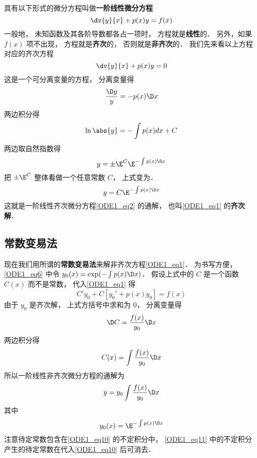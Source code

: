

具有以下形式的微分方程叫做\textbf{一阶线性微分方程}
\begin{equation}\label{ODE1_eq1}
\dv{y}{x} + p(x)y = f(x)
\end{equation}
一般地， 未知函数及其各阶导数都各占一项时， 方程就是\textbf{线性}的． 另外，如果 $f(x)$ 项不出现， 方程就是\textbf{齐次}的， 否则就是\textbf{非齐次}的． 我们先来看以上方程对应的齐次方程
\begin{equation}\label{ODE1_eq2}
\dv{y}{x} + p(x)y = 0
\end{equation}
这是一个可分离变量的方程， 分离变量得
\begin{equation}
\frac{\D y}{y} = -p(x) \D x
\end{equation}
两边积分得
\begin{equation}
\ln\abs{y} = -\int p(x) dx + C
\end{equation}
两边取自然指数得
\begin{equation}
y = \pm \E^C \E^{-\int p(x) \D x}
\end{equation}
把 $\pm \E^C $ 整体看做一个任意常数 $C$， 上式变为．
\begin{equation}\label{ODE1_eq6}
y = C \E^{-\int p(x) \D x}
\end{equation}
这就是一阶线性齐次微分方程\autoref{ODE1_eq2} 的通解， 也叫\autoref{ODE1_eq1} 的\textbf{齐次解}．

\subsection{常数变易法}

现在我们用所谓的\textbf{常数变易法}来解非齐次方程\autoref{ODE1_eq1}． 为书写方便， \autoref{ODE1_eq6} 中令 $y_0(x) = \exp(-\int p(x) \D x)$． 假设上式中的 $C$ 是一个函数 $C(x)$ 而不是常数， 代入\autoref{ODE1_eq1} 得
\begin{equation}
C'y_0 + C[y_0' + p(x)y_0] = f(x)
\end{equation}
由于 $y_0$ 是齐次解， 上式方括号中求和为 0， 分离变量得
\begin{equation}
\D C= \frac{f(x)}{y_0} \D x
\end{equation}
两边积分得
\begin{equation}
C(x) = \int \frac{f(x)}{y_0} \D x
\end{equation}
所以一阶线性非齐次微分方程的通解为
\begin{equation}\label{ODE1_eq10}
y = y_0  \int \frac{f(x)}{y_0} \D x
\end{equation}
其中
\begin{equation}\label{ODE1_eq11}
y_0(x) = \E^{-\int p(x) \D x}
\end{equation}
注意待定常数包含在\autoref{ODE1_eq10} 的不定积分中， \autoref{ODE1_eq11} 中的不定积分产生的待定常数在代入\autoref{ODE1_eq10} 后可消去．